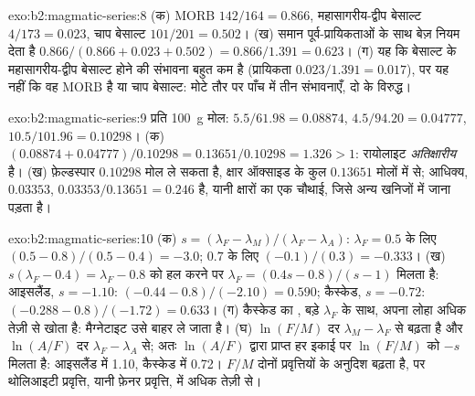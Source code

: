 \begin{solution}{exo:b2:magmatic-series:8}
(क) MORB $142/164 = 0.866$, महासागरीय-द्वीप बेसाल्ट $4/173 = 0.023$, चाप बेसाल्ट $101/201 =
0.502$। (ख) समान पूर्व-प्रायिकताओं के साथ बेज़ नियम देता है $0.866/(0.866 + 0.023 + 0.502) =
0.866/1.391 = 0.623$। (ग) यह कि बेसाल्ट के महासागरीय-द्वीप बेसाल्ट होने की संभावना बहुत कम है
(प्रायिकता $0.023/1.391 = 0.017$), पर यह नहीं कि वह MORB है या चाप बेसाल्ट:
मोटे तौर पर पाँच में तीन संभावनाएँ, दो के विरुद्ध।
\end{solution}

\begin{solution}{exo:b2:magmatic-series:9}
प्रति \qty{100}{g} मोल:  $5.5/61.98 = 0.08874$,  $4.5/94.20 =
0.04777$,  $10.5/101.96 = 0.10298$। (क) $(0.08874 + 0.04777)/0.10298 =
0.13651/0.10298 = 1.326 > 1$: रायोलाइट \emph{अतिक्षारीय} है। (ख) फ़ेल्डस्पार
$0.10298$ मोल ले सकता है, क्षार ऑक्साइड के कुल $0.13651$ मोलों में से; आधिक्य, $0.03353$,
$0.03353/0.13651 = 0.246$ है, यानी क्षारों का एक चौथाई, जिसे अन्य खनिजों में जाना पड़ता है।
\end{solution}

\begin{solution}{exo:b2:magmatic-series:10}
(क) $s = (\lambda_F - \lambda_M)/(\lambda_F - \lambda_A)$: $\lambda_F = 0.5$ के लिए $(0.5
- 0.8)/(0.5 - 0.4) = -3.0$; $0.7$ के लिए $(-0.1)/(0.3) = -0.333$। (ख)
$s(\lambda_F - 0.4) = \lambda_F - 0.8$ को हल करने पर $\lambda_F = (0.4s - 0.8)/(s - 1)$ मिलता है:
आइसलैंड, $s = -1.10$: $(-0.44 - 0.8)/(-2.10) = 0.590$; कैस्केड, $s = -0.72$:
$(-0.288 - 0.8)/(-1.72) = 0.633$। (ग) कैस्केड का , बड़े
$\lambda_F$ के साथ, अपना लोहा अधिक तेज़ी से खोता है: मैग्नेटाइट उसे बाहर ले जाता है। (घ) $\ln(F/M)$
दर $\lambda_M - \lambda_F$ से बढ़ता है और $\ln(A/F)$ दर $\lambda_F - \lambda_A$ से; अतः
$\ln(A/F)$ द्वारा प्राप्त हर इकाई पर $\ln(F/M)$ को $-s$ मिलता है: आइसलैंड में 1.10,
कैस्केड में 0.72। $F/M$ दोनों प्रवृत्तियों के अनुदिश बढ़ता है, पर थोलिआइटी प्रवृत्ति, यानी फ़ेनर
प्रवृत्ति, में अधिक तेज़ी से।
\end{solution}

